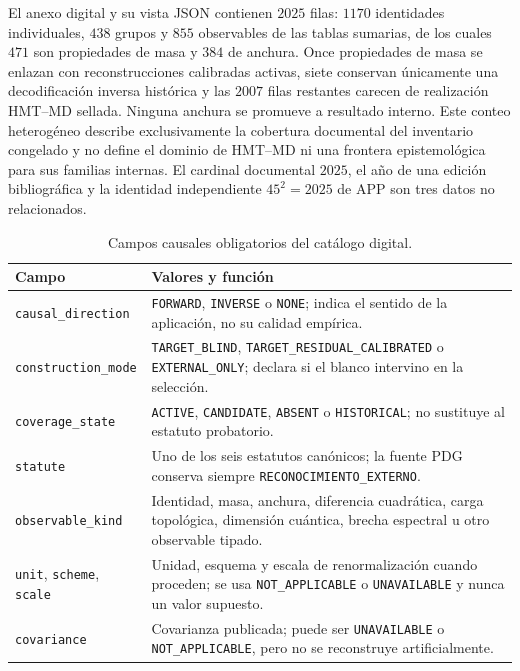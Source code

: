 El anexo digital
 y su
vista JSON contienen \(2025\) filas: \(1170\) identidades individuales,
\(438\) grupos y \(855\) observables de las tablas sumarias, de los cuales
\(471\) son propiedades de masa y \(384\) de anchura. Once propiedades de
masa se enlazan con reconstrucciones calibradas activas, siete conservan
únicamente una decodificación inversa histórica y las \(2007\) filas
restantes carecen de realización HMT--MD sellada. Ninguna anchura se
promueve a resultado interno. Este conteo heterogéneo describe exclusivamente
la cobertura documental del inventario congelado y no define el dominio de
HMT--MD ni una frontera epistemológica para sus familias internas. El cardinal
documental \(2025\), el año de una edición bibliográfica y la identidad
independiente \(45^2=2025\) de APP son tres datos no relacionados.

\begin{table}[htbp]
\centering
\caption{Campos causales obligatorios del catálogo digital.}
\label{tab:esquema-catalogo-tipado}
\small
\begin{tabularx}{\textwidth}{@{}L{0.25\textwidth}Y@{}}
\toprule
Campo & Valores y función\\
\midrule
\texttt{causal\_direction} &
\texttt{FORWARD}, \texttt{INVERSE} o \texttt{NONE}; indica el sentido de la
aplicación, no su calidad empírica.\\
\texttt{construction\_mode} &
\texttt{TARGET\_BLIND}, \texttt{TARGET\_RESIDUAL\_CALIBRATED} o
\texttt{EXTERNAL\_ONLY}; declara si el blanco intervino en la selección.\\
\texttt{coverage\_state} &
\texttt{ACTIVE}, \texttt{CANDIDATE}, \texttt{ABSENT} o
\texttt{HISTORICAL}; no sustituye al estatuto probatorio.\\
\texttt{statute} &
Uno de los seis estatutos canónicos; la fuente PDG conserva siempre
\texttt{RECONOCIMIENTO\_EXTERNO}.\\
\texttt{observable\_kind} &
Identidad, masa, anchura, diferencia cuadrática, carga topológica,
dimensión cuántica, brecha espectral u otro observable tipado.\\
\texttt{unit}, \texttt{scheme}, \texttt{scale} &
Unidad, esquema y escala de renormalización cuando proceden; se usa
\texttt{NOT\_APPLICABLE} o \texttt{UNAVAILABLE} y nunca un valor supuesto.\\
\texttt{covariance} &
Covarianza publicada; puede ser \texttt{UNAVAILABLE} o
\texttt{NOT\_APPLICABLE}, pero no se reconstruye artificialmente.\\
\bottomrule
\end{tabularx}
\end{table}

